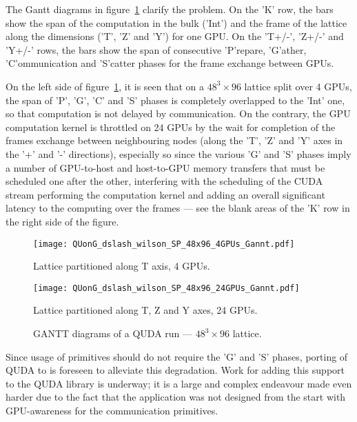 The Gantt diagrams in figure~\ref{fig:qudagantt} clarify the problem.
On the 'K' row, the bars show the span of the computation in the bulk
('Int') and the frame of the lattice along the dimensions ('T', 'Z' and
'Y') for one GPU.
On the 'T+/-', 'Z+/-' and 'Y+/-' rows, the bars show the span of
consecutive 'P'repare, 'G'ather, 'C'ommunication and 'S'catter phases
for the frame exchange between GPUs.

On the left side of figure~\ref{fig:qudagantt}, it is seen that on a
$48^{3}\times96$ lattice split over 4 GPUs, the span of 'P', 'G', 'C'
and 'S' phases is completely overlapped to the 'Int' one, so that
computation is not delayed by communication.
On the contrary, the GPU computation kernel is throttled on 24 GPUs by
the wait for completion of the frames exchange between neighbouring
nodes (along the 'T', 'Z' and 'Y' axes in the '+' and '-' directions),
especially so since the various 'G' and 'S' phases imply a number of
GPU-to-host and host-to-GPU memory transfers that must be scheduled
one after the other, interfering with the scheduling of the CUDA
stream performing the computation kernel and adding an overall
significant latency to the computing over the frames --- see the blank
areas of the 'K' row in the right side of the figure.

\begin{figure}[ht]
  \begin{minipage}[b]{0.45\linewidth}
    \centering
    \texttt{[image: QUonG\_dslash\_wilson\_SP\_48x96\_4GPUs\_Gannt.pdf]}
    \caption*{Lattice partitioned along T axis, 4 GPUs.}
  \end{minipage}
  \hspace{0.5cm}
  \begin{minipage}[b]{0.45\linewidth}
    \centering
    \texttt{[image: QUonG\_dslash\_wilson\_SP\_48x96\_24GPUs\_Gannt.pdf]}
    \caption*{Lattice partitioned along T, Z and Y axes, 24 GPUs.}
  \end{minipage}
  \caption{GANTT diagrams of a QUDA run --- $48^{3}\times96$ lattice.}
  \label{fig:qudagantt}
\end{figure}

Since usage of \PtoP primitives should do not require the 'G' and 'S'
phases, porting of QUDA to \apenetp is foreseen to alleviate this
degradation.
Work for adding this support to the QUDA library is underway; it is a
large and complex endeavour made even harder due to the fact that the
application was not designed from the start with GPU-awareness for the
communication primitives.

